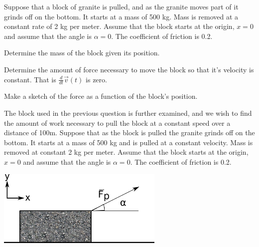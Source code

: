 \begin{problem}
\begin{subproblem}
      \vfill

%
      \vfill

%

  \end{subproblem}


\end{problem}


\begin{problem}
\item Suppose that a block of granite is pulled, and as the
  granite moves part of it grinds off on the bottom. It starts at a mass of 500
  kg. Mass is removed at a constant rate of 2 kg  per meter. Assume
  that the block starts at the origin, $x=0$ and assume that the angle
  is $\alpha=0$. The coefficient of friction is 0.2.

  \begin{subproblem}
  \item Determine the mass of the block given its position.
    \vfill
  \item Determine the amount of force necessary to move the block so
    that it's velocity is constant. That is
    $\frac{d}{dt} \vec{v}(t)$ is zero.
    \vfill
  \item Make a sketch of the force as a function of the block's
    position.

    \vfill
  \end{subproblem}

\clearpage

\item The block used in the previous question is further examined, and we wish
  to find the amount of work necessary to pull the block at a constant
  speed over a distance of 100m.  Suppose that as the block is pulled
  the granite grinds off on the bottom. It starts at a mass of 500 kg
  and is pulled at a constant velocity. Mass is removed at constant 2 kg per
  meter. Assume that the block starts at the origin, $x=0$ and assume
  that the angle is $\alpha=0$. The coefficient of friction is 0.2.

  \includegraphics[width=8cm]{ink/week7/dragBlock}


\end{problem}
